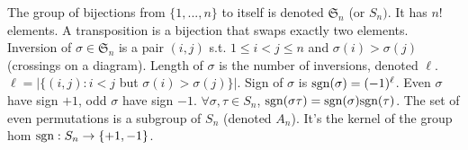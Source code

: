  The group of bijections from
$\{1, ..., n\}$ to itself is denoted $\mathfrak{S}_n$ (or $S_n)$.
It has $n!$ elements.
A transposition is a bijection that swaps exactly two elements.
 Inversion of $\sigma \in \mathfrak{S}_n$ is a pair $(i, j)$
s.t. $1 \le i < j \le n$ and $\sigma(i) > \sigma(j)$ (crossings on a diagram).
Length of $\sigma$ is the number of inversions, denoted $\ell$.
$\ell = |\{(i, j) : i < j$ but $\sigma(i) > \sigma(j)\}|$.
Sign of $\sigma$ is $\text{sgn}(\sigma) = (-1)^{\ell}$.
Even $\sigma$ have sign $+1$, odd $\sigma$ have sign $-1$.
$\forall \sigma, \tau \in S_n$, $\text{sgn}(\sigma \tau) = \text{sgn}(\sigma) \text{sgn}(\tau)$.
The set of even permutations is a subgroup of $S_n$ (denoted $A_n$).
It's the kernel of the group hom $\text{sgn} : S_n \to \{+1, -1\}$.
